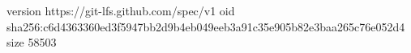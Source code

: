 version https://git-lfs.github.com/spec/v1
oid sha256:c6d4363360ed3f5947bb2d9b4eb049eeb3a91c35e905b82e3baa265c76e052d4
size 58503

